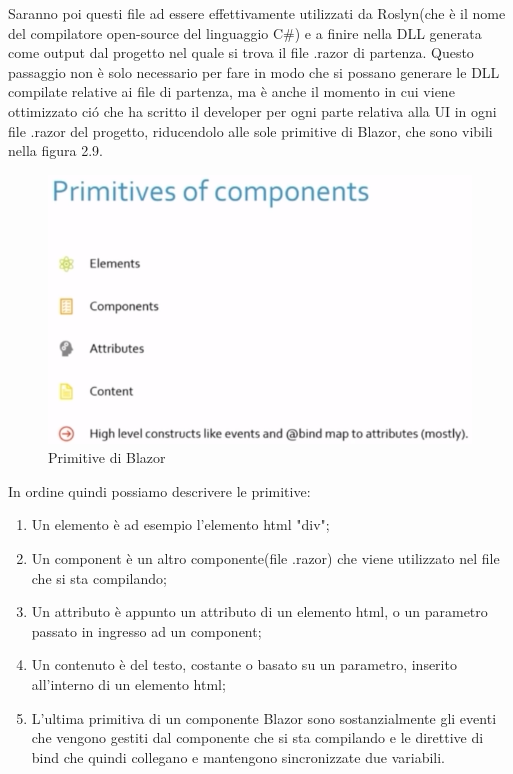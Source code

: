 Saranno poi questi file ad essere effettivamente utilizzati da Roslyn(che \`e il nome del compilatore open-source del linguaggio C\#) e a finire nella DLL generata come output dal progetto nel quale si trova il file .razor di partenza.
Questo passaggio non \`e solo necessario per fare in modo che si possano generare le DLL compilate relative ai file di partenza, ma \`e anche il momento in cui viene ottimizzato ci\'o che ha scritto il developer per ogni parte relativa alla UI in ogni file .razor del progetto, riducendolo alle sole primitive di Blazor, che sono vibili nella figura 2.9.

\begin{figure}[H]
	\centerline{\includegraphics[scale=0.7]{figure/BlazorPrimitives.PNG}}
	\caption{Primitive di Blazor\cite{ryanNowakNDCSydney}}
	\label{fig:BlazorPrimitives}
\end{figure}

In ordine quindi possiamo descrivere le primitive:
\begin{enumerate}
\item Un elemento \`e ad esempio l'elemento html "div";
\item Un component \`e un altro componente(file .razor) che viene utilizzato nel file che si sta compilando;
\item Un attributo \`e appunto un attributo di un elemento html, o un parametro passato in ingresso ad un component;
\item Un contenuto \`e del testo, costante o basato su un parametro, inserito all'interno di un elemento html;
\item L'ultima primitiva di un componente Blazor sono sostanzialmente gli eventi che vengono gestiti dal componente che si sta compilando e le direttive di bind che quindi collegano e mantengono sincronizzate due variabili.
\end{enumerate}

\pagebreak